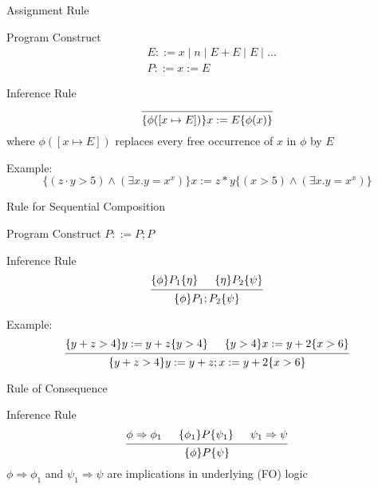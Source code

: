 \documentclass[presentation]{beamer}
\begin{document}
\begin{frame}[label={sec:org5589228}]{Assignment Rule}
\begin{block}{Program Construct}
\begin{align*}
&E::= x\mid n\mid E+E\mid E\mid \dots\\
&P::=x:=E
\end{align*}
\end{block}

\begin{block}{Inference Rule}
\begin{equation*}
\begin{prooftree}%
\hypo{}
\infer1{\{\phi([x\mapsto E])\}x:=E\{\phi(x)\}}
\end{prooftree}
\end{equation*}
where \(\phi([x\mapsto E])\) replaces every free occurrence of \(x\) in \(\phi\) by \(E\)
\end{block}

Example:
\begin{equation*}
\{(z\cdot y>5)\wedge(\exists x.y=x^x)\}x:=z*y\{(x>5)\wedge(\exists x.y=x^x)\}
\end{equation*}
\end{frame}
\begin{frame}[label={sec:org4d3232e}]{Rule for Sequential Composition}
\begin{block}{Program Construct}
\(P::=P;P\)
\end{block}

\begin{block}{Inference Rule}
\begin{equation*}
\begin{prooftree}%
\hypo{\{\phi\}P_1\{\eta\}}
\hypo{\{\eta\}P_2\{\psi\}}
\infer2{\{\phi\}P_1;P_2\{\psi\}}
\end{prooftree}
\end{equation*}
\end{block}

Example:
\begin{equation*}
\begin{prooftree}%
\hypo{\{y+z>4\}y:=y+z\{y>4\}}
\hypo{\{y>4\}x:=y+2\{x>6\}}
\infer2{\{y+z>4\}y:=y+z;x:=y+2\{x>6\}}
\end{prooftree}
\end{equation*}
\end{frame}
\begin{frame}[label={sec:orgeea7ab3}]{Rule of Consequence}
\begin{block}{Inference Rule}
\begin{equation*}
\begin{prooftree}%
\hypo{\phi\Rightarrow\phi_1}
\hypo{\{\phi_1\}P\{\psi_1\}}
\hypo{\psi_1\Rightarrow\psi}
\infer3{\{\phi\}P\{\psi\}}
\end{prooftree}
\end{equation*}
\(\phi\Rightarrow\phi_1\) and \(\psi_1\Rightarrow\psi\) are implications in underlying (FO) logic
\end{block}
\end{frame}
\end{document}
